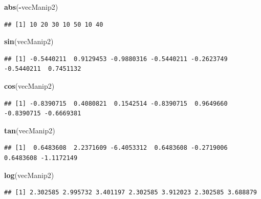 \documentclass[
]{book}
\newenvironment{Shaded}{\begin{snugshade}}{\end{snugshade}}
\newcommand{\KeywordTok}[1]{\textcolor[rgb]{0.13,0.29,0.53}{\textbf{#1}}}
\newcommand{\NormalTok}[1]{#1}
\newcommand{\OperatorTok}[1]{\textcolor[rgb]{0.81,0.36,0.00}{\textbf{#1}}}
\begin{document}
\begin{Shaded}
\begin{Highlighting}[]
\KeywordTok{abs}\NormalTok{(}\OperatorTok{-}\NormalTok{vecManip2)}
\end{Highlighting}
\end{Shaded}

\begin{verbatim}
## [1] 10 20 30 10 50 10 40
\end{verbatim}

\begin{Shaded}
\begin{Highlighting}[]
\KeywordTok{sin}\NormalTok{(vecManip2)}
\end{Highlighting}
\end{Shaded}

\begin{verbatim}
## [1] -0.5440211  0.9129453 -0.9880316 -0.5440211 -0.2623749 -0.5440211  0.7451132
\end{verbatim}

\begin{Shaded}
\begin{Highlighting}[]
\KeywordTok{cos}\NormalTok{(vecManip2)}
\end{Highlighting}
\end{Shaded}

\begin{verbatim}
## [1] -0.8390715  0.4080821  0.1542514 -0.8390715  0.9649660 -0.8390715 -0.6669381
\end{verbatim}

\begin{Shaded}
\begin{Highlighting}[]
\KeywordTok{tan}\NormalTok{(vecManip2)}
\end{Highlighting}
\end{Shaded}

\begin{verbatim}
## [1]  0.6483608  2.2371609 -6.4053312  0.6483608 -0.2719006  0.6483608 -1.1172149
\end{verbatim}

\begin{Shaded}
\begin{Highlighting}[]
\KeywordTok{log}\NormalTok{(vecManip2)}
\end{Highlighting}
\end{Shaded}

\begin{verbatim}
## [1] 2.302585 2.995732 3.401197 2.302585 3.912023 2.302585 3.688879
\end{verbatim}
\end{document}
